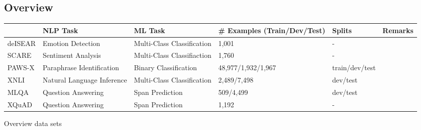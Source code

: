 \begin{landscape}

\subsection{Overview}

{\begin{tabularx}{\linewidth}{l|llllX}
           & NLP Task                   & ML Task                    & \# Examples (Train/Dev/Test) & Splits         & Remarks \\ \toprule
  deISEAR  &  Emotion Detection          & Multi-Class Classification & 1,001                        & -              &         \\
  SCARE    & Sentiment Analysis         & Multi-Class Classifiaction & 1,760                        & -              &         \\ \hline
  PAWS-X   & Paraphrase Identification  & Binary Classification      & 48,977/1,932/1,967           & train/dev/test &         \\
  XNLI     & Natural Language Inference & Multi-Class Classification & 2,489/7,498                  & dev/test       &         \\ \hline
  MLQA     & Question Answering         & Span Prediction            & 509/4,499                    & dev/test       &         \\
  XQuAD    & Question Answering         & Span Prediction            & 1,192                        & -              &
\end{tabularx}
}{Overview data sets}


\end{landscape}
%
